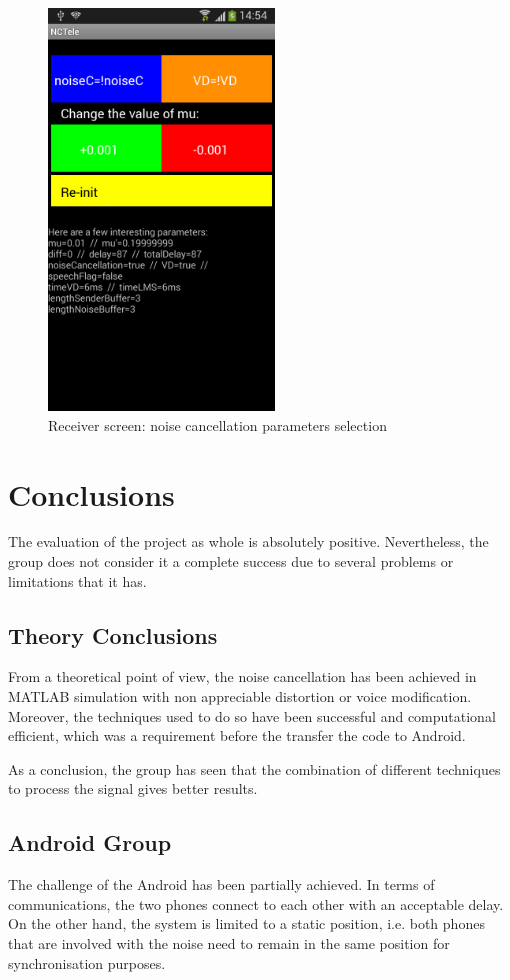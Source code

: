 \documentclass[11pt,a4paper,english]{book}  %
\theoremstyle{definition}  %
\theoremstyle{plain}  %
\theoremstyle{remark}  %
\begin{document}
		\begin{figure}[h]
		\centering
		\includegraphics[width=6cm]{images/android/receiverscreen.jpg}
		\caption{Receiver screen: noise cancellation parameters selection}
		\label{fig:receiver}
		\end{figure}
	

\chapter{Conclusions}

The evaluation of the project as whole is absolutely positive. Nevertheless, the group does not consider it a complete success due to several problems or limitations that it has.


\section{Theory Conclusions}
From a theoretical point of view, the noise cancellation has been achieved in MATLAB simulation with non appreciable distortion or voice modification. Moreover, the techniques used to do so have been successful and computational efficient, which was a requirement before the transfer the code to Android.

As a conclusion, the group has seen that the combination of different techniques to process the signal gives better results.

\section{Android Group}
The challenge of the Android has been partially achieved. In terms of communications, the two phones connect to each other with an acceptable delay. On the other hand, the system is limited to a static position, i.e. both phones that are involved with the noise need to remain in the same position for synchronisation purposes.
\end{document}
